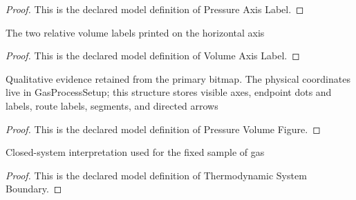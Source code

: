 \begin{proof}
  This is the declared model definition of Pressure Axis Label.
\end{proof}
\begin{definition}
  \label{def:physics:phyx-mini-0408:phyxminiproblems-problemphyxmini0408-volumeaxislabel}
  The two relative volume labels printed on the horizontal axis
\end{definition}
\begin{proof}
  This is the declared model definition of Volume Axis Label.
\end{proof}
\begin{definition}
  \label{def:physics:phyx-mini-0408:phyxminiproblems-problemphyxmini0408-pressurevolumefigure}
  Qualitative evidence retained from the primary bitmap. The physical coordinates live in GasProcessSetup; this structure stores visible axes, endpoint dots and labels, route labels, segments, and directed arrows
\end{definition}
\begin{proof}
  This is the declared model definition of Pressure Volume Figure.
\end{proof}
\begin{definition}
  \label{def:physics:phyx-mini-0408:phyxminiproblems-problemphyxmini0408-thermodynamicsystemboundary}
  Closed-system interpretation used for the fixed sample of gas
\end{definition}
\begin{proof}
  This is the declared model definition of Thermodynamic System Boundary.
\end{proof}
